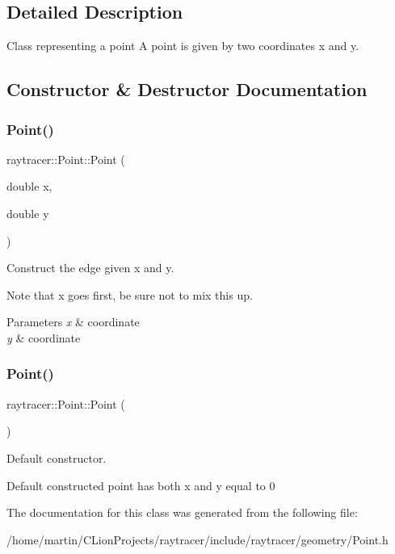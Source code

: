\subsection{Detailed Description}
Class representing a point A point is given by two coordinates x and y. 

\subsection{Constructor \& Destructor Documentation}
\mbox{\label{classraytracer_1_1Point_a83811a7a3dde9274ec54594382022881}} 
\subsubsection{\texorpdfstring{Point()}{Point()}\hspace{0.1cm}{\footnotesize\ttfamily [1/2]}}
{\footnotesize\ttfamily raytracer\+::\+Point\+::\+Point (\begin{DoxyParamCaption}\item[{double}]{x,  }\item[{double}]{y }\end{DoxyParamCaption})}



Construct the edge given x and y. 

Note that x goes first, be sure not to mix this up. 
\begin{DoxyParams}{Parameters}
{\em x} & coordinate \\
\hline
{\em y} & coordinate \\
\hline
\end{DoxyParams}
\mbox{\label{classraytracer_1_1Point_a32f294cfdddaea0eade54bf7d075fa3a}} 
\subsubsection{\texorpdfstring{Point()}{Point()}\hspace{0.1cm}{\footnotesize\ttfamily [2/2]}}
{\footnotesize\ttfamily raytracer\+::\+Point\+::\+Point (\begin{DoxyParamCaption}{ }\end{DoxyParamCaption})\hspace{0.3cm}{\ttfamily [default]}}



Default constructor. 

Default constructed point has both x and y equal to 0 

The documentation for this class was generated from the following file\+:\begin{DoxyCompactItemize}
\item 
/home/martin/\+C\+Lion\+Projects/raytracer/include/raytracer/geometry/Point.\+h\end{DoxyCompactItemize}
